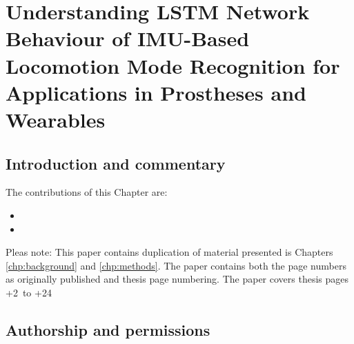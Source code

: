 \chapter[Paper: LSTM Network Behaviour for IMU Based Locomotion Mode Recognition Systems]{Understanding LSTM Network Behaviour of IMU-Based Locomotion Mode Recognition for Applications in Prostheses and Wearables}
\label{chp:lstm-general}

\section{Introduction and commentary}
\newcommand\x{\value{page}}

The contributions of this Chapter are:
\begin{itemize}
    \item 
    \item 
\end{itemize}

Pleas note: This paper contains duplication of material presented is Chapters \ref{chp:background} and \ref{chp:methods}. The paper contains both the page numbers as originally published and thesis page numbering. The paper covers thesis pages \the\numexpr\x+2\relax \ to \the\numexpr\x+24\relax

\clearpage
\section{Authorship and permissions}
\newcommand{\backgoundColor}{1,1,1}
\newcommand{\boxColor}{0.95,0.95,0.95}

